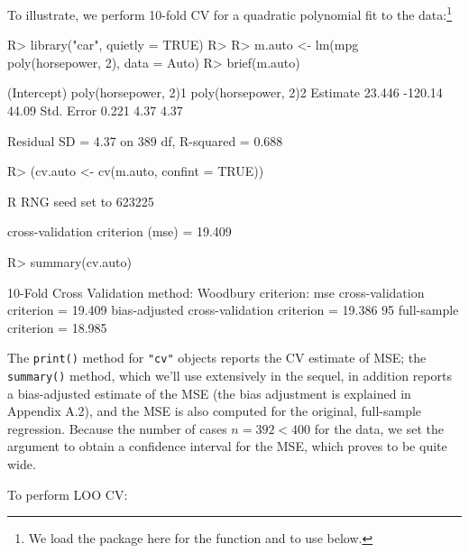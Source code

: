 \documentclass[
]{jss}
\begin{document}
To illustrate, we perform 10-fold CV for a quadratic polynomial fit to
the  data:\footnote{We load the  package
  \citep{FoxWeisberg:2019} here for the  function and to
  use below.}

\begin{CodeChunk}
\begin{CodeInput}
R> library("car", quietly = TRUE)
R>
R> m.auto <- lm(mpg ~ poly(horsepower, 2), data = Auto)
R> brief(m.auto)
\end{CodeInput}
\begin{CodeOutput}
           (Intercept) poly(horsepower, 2)1 poly(horsepower, 2)2
Estimate        23.446              -120.14                44.09
Std. Error       0.221                 4.37                 4.37

 Residual SD = 4.37 on 389 df, R-squared = 0.688
\end{CodeOutput}
\begin{CodeInput}
R> (cv.auto <- cv(m.auto, confint = TRUE))
\end{CodeInput}
\begin{CodeOutput}
R RNG seed set to 623225
\end{CodeOutput}
\begin{CodeOutput}
cross-validation criterion (mse) = 19.409
\end{CodeOutput}
\begin{CodeInput}
R> summary(cv.auto)
\end{CodeInput}
\begin{CodeOutput}
10-Fold Cross Validation
method: Woodbury
criterion: mse
cross-validation criterion = 19.409
bias-adjusted cross-validation criterion = 19.386
95%
full-sample criterion = 18.985
\end{CodeOutput}
\end{CodeChunk}

The \texttt{print()} method for \texttt{"cv"} objects reports the CV
estimate of MSE; the \texttt{summary()} method, which we'll use
extensively in the sequel, in addition reports a bias-adjusted estimate
of the MSE (the bias adjustment is explained in Appendix A.2), and the
MSE is also computed for the original, full-sample regression. Because
the number of cases \(n = 392 < 400\) for the  data, we set
the argument  to obtain a confidence interval for
the MSE, which proves to be quite wide.

To perform LOO CV:
\end{document}
